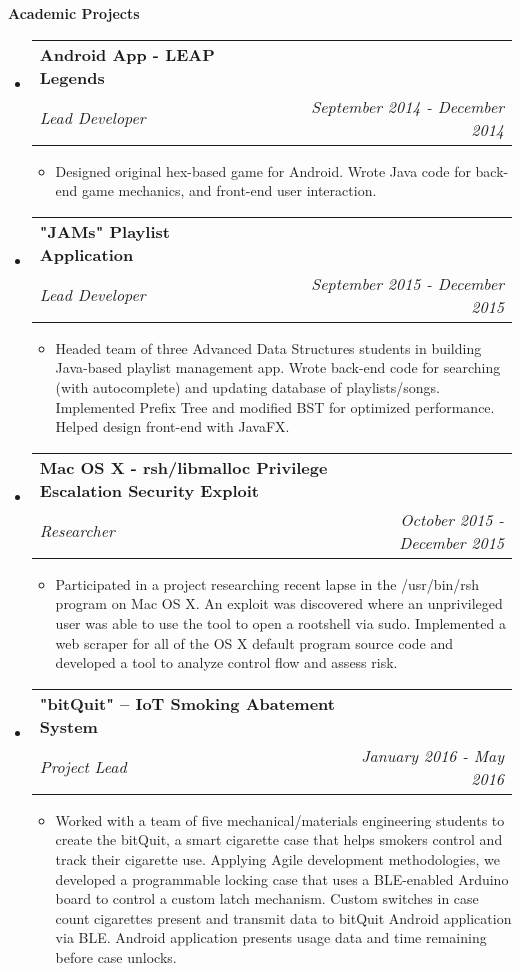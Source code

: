 \documentclass[letterpaper,11pt]{article}
\makeatletter
\newcommand{\resitem}[1]{\item #1 \vspace{-2pt}}
\newcommand{\resheading}[1]{{\large \colorbox{mygrey}{\begin{minipage}{\textwidth}{\textbf{#1 \vphantom{p\^{E}}}}\end{minipage}}}}
\newcommand{\ressubheading}[4]{
\begin{tabular*}{7.0in}{l@{\extracolsep{\fill}}r}
    \textbf{#1} & #2 \\
    \textit{#3} & \textit{#4} \\
\end{tabular*}\vspace{-6pt}}
\makeatother
\begin{document}
\resheading{Academic Projects}
\begin{itemize}

\item
\ressubheading{Android App - LEAP Legends}{}{Lead Developer}{September 2014 - December 2014}
\begin{itemize}
\resitem{Designed original hex-based game for Android. Wrote Java code for back-end game mechanics, and front-end user interaction.}
\end{itemize}

\item
\ressubheading{"JAMs" Playlist Application}{}{Lead Developer}{September 2015 - December 2015}
\begin{itemize}
\resitem{Headed team of three Advanced Data Structures students in building Java-based playlist management app. Wrote back-end code for searching (with autocomplete) and updating database of playlists/songs. Implemented Prefix Tree and modified BST for optimized performance. Helped design front-end with JavaFX.}
\end{itemize}

\item
\ressubheading{Mac OS X - rsh/libmalloc Privilege Escalation Security Exploit}{}{Researcher}{October 2015 - December 2015}
\begin{itemize}
\resitem{Participated in a project researching recent lapse in the /usr/bin/rsh program on Mac OS X. An exploit was discovered where an unprivileged user was able to use the tool to open a rootshell via sudo. Implemented a web scraper for all of the OS X default program source code and developed a tool to analyze control flow and assess risk.}
\end{itemize}

\item
\ressubheading{"bitQuit" -- IoT Smoking Abatement System}{}{Project Lead}{January 2016 - May 2016}
\begin{itemize}
\resitem{Worked with a team of five mechanical/materials engineering students to create the bitQuit, a smart cigarette case that helps smokers control and track their cigarette use. Applying Agile development methodologies, we developed a programmable locking case that uses a BLE-enabled Arduino board to control a custom latch mechanism. Custom switches in case count cigarettes present and transmit data to bitQuit Android application via BLE. Android application presents usage data and time remaining before case unlocks.}
\end{itemize}



\end{itemize}
\end{document}
